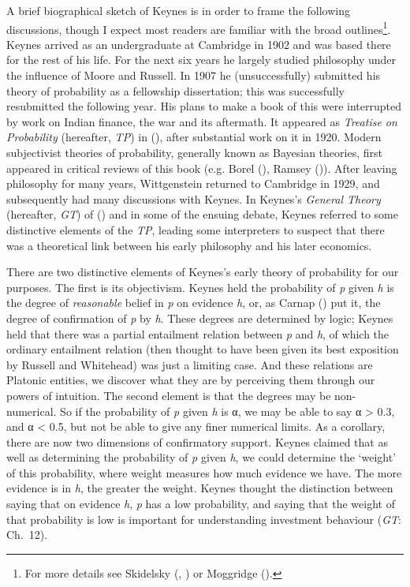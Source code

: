 \documentclass[
  11pt,
  letterpaper,
  DIV=11,
  numbers=noendperiod,
  twoside]{scrartcl}
\begin{document}
A brief biographical sketch of Keynes is in order to frame the following
discussions, though I expect most readers are familiar with the broad
outlines\footnote{For more details see Skidelsky
  (,
  ) or Moggridge
  ().}. Keynes arrived as an
undergraduate at Cambridge in 1902 and was based there for the rest of
his life. For the next six years he largely studied philosophy under the
influence of Moore and Russell. In 1907 he (unsuccessfully) submitted
his theory of probability as a fellowship dissertation; this was
successfully resubmitted the following year. His plans to make a book of
this were interrupted by work on Indian finance, the war and its
aftermath. It appeared as \emph{Treatise on Probability} (hereafter,
\emph{TP}) in (), after substantial work
on it in 1920. Modern subjectivist theories of probability, generally
known as Bayesian theories, first appeared in critical reviews of this
book (e.g. Borel (), Ramsey
()). After leaving philosophy for
many years, Wittgenstein returned to Cambridge in 1929, and subsequently
had many discussions with Keynes. In Keynes's \emph{General Theory}
(hereafter, \emph{GT}) of () and in some
of the ensuing debate, Keynes referred to some distinctive elements of
the \emph{TP}, leading some interpreters to suspect that there was a
theoretical link between his early philosophy and his later economics.

There are two distinctive elements of Keynes's early theory of
probability for our purposes. The first is its objectivism. Keynes held
the probability of \emph{p} given \emph{h} is the degree of
\emph{reasonable} belief in \emph{p} on evidence \emph{h}, or, as Carnap
() put it, the degree of confirmation of
\emph{p} by \emph{h}. These degrees are determined by logic; Keynes held
that there was a partial entailment relation between \emph{p} and
\emph{h}, of which the ordinary entailment relation (then thought to
have been given its best exposition by Russell and Whitehead) was just a
limiting case. And these relations are Platonic entities, we discover
what they are by perceiving them through our powers of intuition. The
second element is that the degrees may be non-numerical. So if the
probability of \emph{p} given \emph{h} is α, we may be able to say α
\textgreater{} 0.3, and α \textless{} 0.5, but not be able to give any
finer numerical limits. As a corollary, there are now two dimensions of
confirmatory support. Keynes claimed that as well as determining the
probability of \emph{p} given \emph{h}, we could determine the `weight'
of this probability, where weight measures how much evidence we have.
The more evidence is in \emph{h}, the greater the weight. Keynes thought
the distinction between saying that on evidence \emph{h}, \emph{p} has a
low probability, and saying that the weight of that probability is low
is important for understanding investment behaviour (\emph{GT}: Ch.~12).
\end{document}
